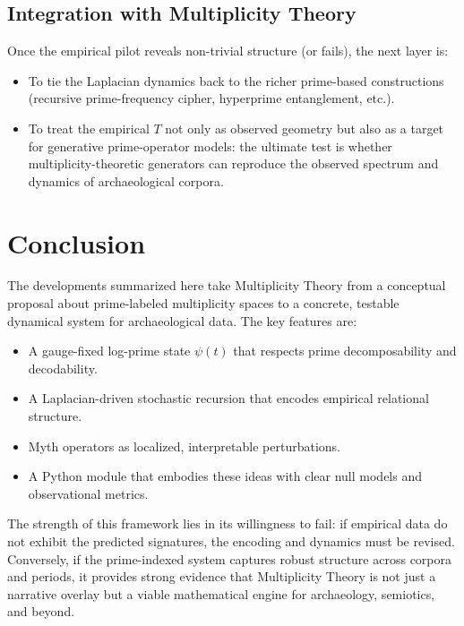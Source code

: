 \documentclass[11pt]{article}
\begin{document}
\subsection{Integration with Multiplicity Theory}

Once the empirical pilot reveals non-trivial structure (or fails),
the next layer is:
\begin{itemize}[nosep]
  \item To tie the Laplacian dynamics back to the richer prime-based
        constructions (recursive prime-frequency cipher, hyperprime
        entanglement, etc.).
  \item To treat the empirical \(T\) not only as observed geometry but
        also as a target for generative prime-operator models: the
        ultimate test is whether multiplicity-theoretic generators
        can reproduce the observed spectrum and dynamics of archaeological
        corpora.
\end{itemize}

\section{Conclusion}

The developments summarized here take Multiplicity Theory from a
conceptual proposal about prime-labeled multiplicity spaces to a
concrete, testable dynamical system for archaeological data. The key
features are:
\begin{itemize}[nosep]
  \item A gauge-fixed log-prime state \(\psi(t)\) that respects prime
        decomposability and decodability.
  \item A Laplacian-driven stochastic recursion that encodes empirical
        relational structure.
  \item Myth operators as localized, interpretable perturbations.
  \item A Python module that embodies these ideas with clear null
        models and observational metrics.
\end{itemize}

The strength of this framework lies in its willingness to fail:
if empirical data do not exhibit the predicted signatures, the
encoding and dynamics must be revised. Conversely, if the prime-indexed
system captures robust structure across corpora and periods, it
provides strong evidence that Multiplicity Theory is not just a
narrative overlay but a viable mathematical engine for archaeology,
semiotics, and beyond.
\end{document}

